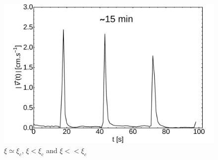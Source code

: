 \documentclass[aps, twocolumn, floatfix, superscriptaddress]{revtex4}
\begin{document}
\begin{figure}[h!]
\begin{minipage}[c]{0.3\linewidth}
		\centering
		\includegraphics[width=\textwidth]{uvst_65dypcm_c.pdf}
	\end{minipage}
	\caption{$\xi \simeq \xi_{c}$, $\xi < \xi_{c}$ and $\xi << \xi_{c}$}\label{fig:uvst_65dypcm}
\end{figure}
\end{document}
